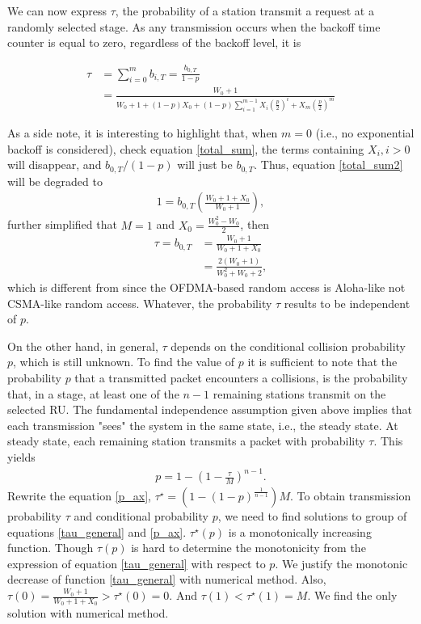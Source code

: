 We can now express $\tau$, the probability of a station transmit a request at a randomly selected stage.
As any transmission occurs when the backoff time counter is equal to zero, regardless of the backoff level, it is

\begin{align}
\label{tau_general}
\tau &= \sum_{i=0}^m b_{i,T} = \frac{b_{0,T}}{1-p}  \nonumber \\
 &=\frac{W_0+1}{W_0+1+(1-p)X_0+(1-p) \sum_{i=1}^{m-1}X_i\left( \frac{p}{2}\right)^i+X_m\left( \frac{p}{2}\right)^m}
\end{align}

As a side note, it is interesting to highlight that, when $m=0$ (i.e., no exponential backoff is considered), check equation \ref{total_sum}, the terms containing $X_i, i>0$ will disappear, and $b_{0,T}/(1-p)$ will just be $b_{0,T}$.
Thus, equation \ref{total_sum2} will be degraded to 
\begin{align}
1 = b_{0,T}\left( \frac{W_0+1+X_0}{W_0+1}\right),
\end{align}
further simplified that $M=1$ and $X_0=\frac{W_0^2-W_0}{2}$, then
\begin{align}
\tau = b_{0,T} &= \frac{W_0+1}{W_0+1+X_0} \nonumber\\
			   &= \frac{2(W_0+1)}{W_0^2+W_0+2},
\label{tau_W0}
\end{align}
which is different from \cite{ho1996performance} since the OFDMA-based random access is Aloha-like not CSMA-like random access. 
Whatever, the probability $\tau$ results to be independent of $p$.

On the other hand, in general, $\tau$ depends on the conditional collision probability $p$, which is still unknown. To find the value of $p$ it is sufficient to note that the probability $p$ that a transmitted packet encounters a collisions, is the probability that, in a stage, at least one of the $n-1$ remaining stations transmit on the selected RU. 
The fundamental independence assumption given above implies that each transmission "sees" the system in the same state, i.e., the steady state. 
At steady state, each remaining station transmits a packet with probability $\tau$. This yields 
\begin{align}
\label{p_ax}
p = 1-\left( 1-\frac{\tau}{M} \right)^{n-1}.
\end{align}
Rewrite the equation \ref{p_ax}, $\tau^\star = \left(1-(1-p)^\frac{1}{n-1} \right)M$. 
To obtain transmission probability $\tau$ and conditional probability $p$, we need to find solutions to group of equations \ref{tau_general} and \ref{p_ax}.
$\tau^\star(p)$ is a monotonically increasing function. 
Though $\tau(p)$ is hard to determine the monotonicity from the expression of equation \ref{tau_general} with respect to $p$. 
We justify the monotonic decrease of function \ref{tau_general} with numerical method. 
Also, $\tau(0) = \frac{W_0+1}{W_0+1+X_0}> \tau^\star(0) = 0$.
And $\tau(1) < \tau^\star(1) = M$. We find the only solution with numerical method.



